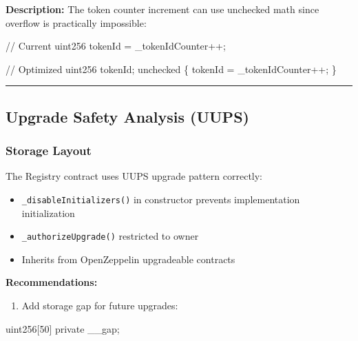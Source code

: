 \documentclass[
]{article}
\newenvironment{Shaded}{}{}
\newcommand{\NormalTok}[1]{#1}
\providecommand{\tightlist}{%
  \setlength{\itemsep}{0pt}\setlength{\parskip}{0pt}}
\begin{document}
\textbf{Description:} The token counter increment can use unchecked math
since overflow is practically impossible:

\begin{Shaded}
\begin{Highlighting}[]
\NormalTok{// Current}
\NormalTok{uint256 tokenId = \_tokenIdCounter++;}

\NormalTok{// Optimized}
\NormalTok{uint256 tokenId;}
\NormalTok{unchecked \{ tokenId = \_tokenIdCounter++; \}}
\end{Highlighting}
\end{Shaded}

\begin{center}\rule{0.5\linewidth}{0.5pt}\end{center}

\subsection{Upgrade Safety Analysis
(UUPS)}\label{upgrade-safety-analysis-uups}

\subsubsection{Storage Layout}\label{storage-layout}

The Registry contract uses UUPS upgrade pattern correctly:

\begin{itemize}
\tightlist
\item
  \texttt{\_disableInitializers()} in constructor prevents
  implementation initialization
\item
  \texttt{\_authorizeUpgrade()} restricted to owner
\item
  Inherits from OpenZeppelin upgradeable contracts
\end{itemize}

\textbf{Recommendations:}

\begin{enumerate}
\def\labelenumi{\arabic{enumi}.}
\tightlist
\item
  Add storage gap for future upgrades:
\end{enumerate}

\begin{Shaded}
\begin{Highlighting}[]
\NormalTok{uint256[50] private \_\_gap;}
\end{Highlighting}
\end{Shaded}
\end{document}
